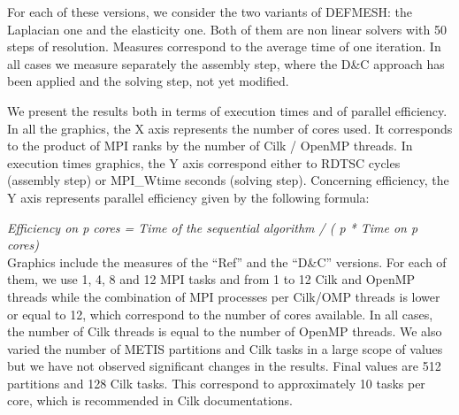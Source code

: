 \documentclass{IOS-Book-Article}
\begin{document}
For each of these versions, we consider the two variants of DEFMESH: the Laplacian one and the elasticity one.
Both of them are non linear solvers with 50 steps of resolution. Measures correspond to the average time of one iteration.
In all cases we measure separately the assembly step, where the D\&C approach has been applied and the solving step, not yet modified.

We present the results both in terms of execution times and of parallel efficiency.
In all the graphics, the X axis represents the number of cores used. It corresponds to the product of MPI ranks by the number of Cilk / OpenMP threads.
In execution times graphics, the Y axis correspond either to RDTSC cycles (assembly step) or MPI\_Wtime seconds (solving step).
Concerning efficiency, the Y axis represents parallel efficiency given by the following formula:

\emph{Efficiency on p cores = Time of the sequential algorithm / ( p * Time on p cores)}\\

Graphics include the measures of the “Ref” and the “D\&C” versions.
For each of them, we use 1, 4, 8 and 12 MPI tasks and from 1 to 12 Cilk and OpenMP threads while the combination of MPI processes per Cilk/OMP threads is lower or equal to 12,
which correspond to the number of cores available. In all cases, the number of Cilk threads is equal to the number of OpenMP threads.
We also varied the number of METIS partitions and Cilk tasks in a large scope of values but we have not observed significant changes in the results.
Final values are 512 partitions and 128 Cilk tasks. This correspond to approximately 10 tasks per core, which is recommended in Cilk documentations.
\end{document}

